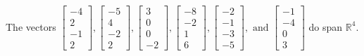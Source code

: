 \begin{exercise}
\begin{exerciseStatement}
  \end{exerciseStatement}
  \begin{exerciseAnswer}
   The vectors \(\left[\begin{array}{r}
-4 \\
2 \\
-1 \\
2
\end{array}\right] , \left[\begin{array}{r}
-5 \\
4 \\
-2 \\
2
\end{array}\right] , \left[\begin{array}{r}
3 \\
0 \\
0 \\
-2
\end{array}\right] , \left[\begin{array}{r}
-8 \\
-2 \\
1 \\
6
\end{array}\right] , \left[\begin{array}{r}
-2 \\
-1 \\
-3 \\
-5
\end{array}\right] , \text{ and } \left[\begin{array}{r}
-1 \\
-4 \\
0 \\
3
\end{array}\right]\) 
  	 do  
	span \(\mathbb{R}^4\).
  


  \end{exerciseAnswer}
\end{exercise}